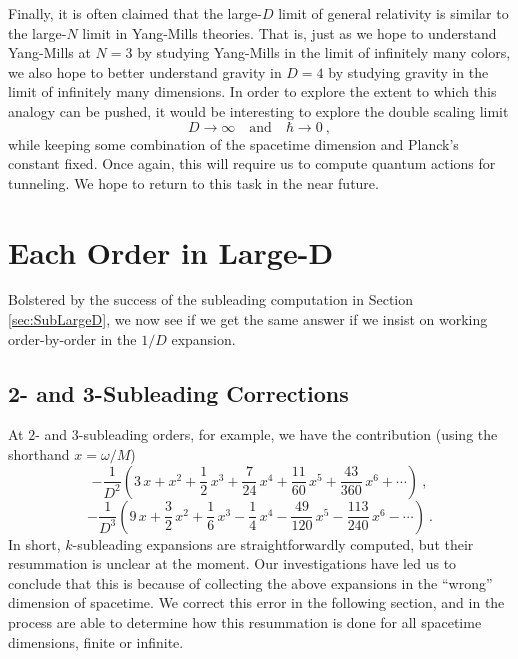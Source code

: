 \documentclass[a4paper,11pt]{article}
\begin{document}
Finally, it is often claimed that the large-$D$ limit of general relativity is similar to the large-$N$ limit in Yang-Mills theories. That is, just as we hope to understand Yang-Mills at $N = 3$ by studying Yang-Mills in the limit of infinitely many colors, we also hope to better understand gravity in $D = 4$ by studying gravity in the limit of infinitely many dimensions. In order to explore the extent to which this analogy can be pushed, it would be interesting to explore the double scaling limit
\begin{equation}
D \rightarrow \infty \quad \text{and} \quad \hbar \rightarrow 0 \ ,
\end{equation}
while keeping some combination of the spacetime dimension and Planck's constant fixed. Once again, this will require us to compute quantum actions for tunneling. We hope to return to this task in the near future.


\appendix

\section{Each Order in Large-D}
\label{sec:AppA}
Bolstered by the success of the subleading computation in Section \ref{sec:SubLargeD}, we now see if we get the same answer if we insist on working order-by-order in the $1/D$ expansion.
\subsection{2- and 3-Subleading Corrections}
At $2$- and $3$-subleading orders, for example, we have the contribution (using the shorthand $x = \omega/M$)
\begin{equation}
\label{eq:D2x}
-\frac{1}{D^2} \left( 3\, x + x^2 + \frac{1}{2} \,x^3 + \frac{7}{24} \,x^4 + \frac{11}{60}\, x^5 + \frac{43}{360}\, x^6 + \cdots \right) \ ,
\end{equation}
\begin{equation}
\label{eq:D3x}
-\frac{1}{D^3} \left( 9\, x + \frac{3}{2} \,x^2 + \frac{1}{6} \,x^3 - \frac{1}{4} \,x^4 - \frac{49}{120} \,x^5 - \frac{113}{240} \,x^6 - \cdots \right) \ .
\end{equation}
In short, $k$-subleading expansions are straightforwardly computed, but their resummation is unclear at the moment. Our investigations have led us to conclude that this is because of collecting the above expansions in the ``wrong'' dimension of spacetime. We correct this error in the following section, and in the process are able to determine how this resummation is done for all spacetime dimensions, finite or infinite.
\end{document}
